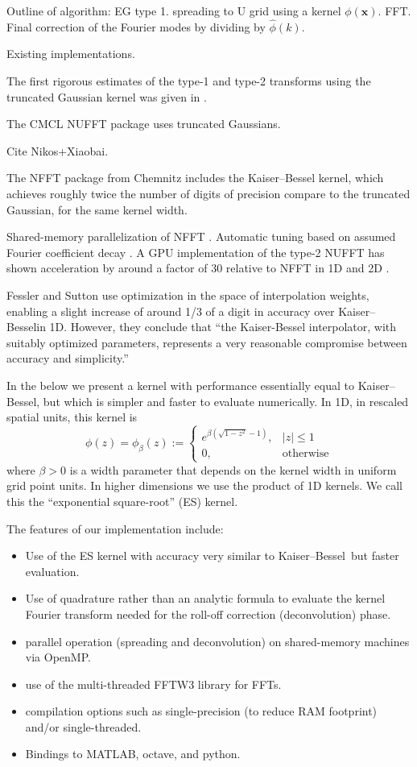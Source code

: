 \documentclass[10pt]{article}
\newcommand{\bi}{\begin{itemize}}
\newcommand{\ei}{\end{itemize}}
\newcommand{\be}{\begin{equation}}
\newcommand{\ee}{\end{equation}}
\newcommand{\mbf}[1]{{\mathbf #1}}
\newcommand{\xx}{\mbf{x}}
\newcommand{\KB}{Kaiser--Bessel}
\newcommand{\wid}{\beta}               %
\begin{document}
Outline of algorithm:
EG type 1.
spreading to U grid using a kernel $\phi(\xx)$.
FFT.
Final correction of the Fourier modes by dividing by
$\hat\phi(k)$.


Existing implementations.

The first rigorous estimates of the type-1 and type-2 transforms
using the truncated Gaussian kernel was given in \cite{dutt}.

The CMCL NUFFT package \cite{cmcl,nufft,nufft3} uses truncated Gaussians.


Cite Nikos+Xiaobai.

The NFFT package \cite{nfft} from Chemnitz
includes the Kaiser--Bessel kernel,
which
achieves roughly twice the number of digits of precision
compare to the truncated Gaussian, for the same kernel width.

Shared-memory parallelization of NFFT \cite{volkmer}.
Automatic tuning based on assumed Fourier coefficient decay \cite{nestler}.
A GPU implementation of the type-2 NUFFT has shown acceleration by around
a factor of 30 relative to NFFT in 1D and 2D \cite{cunfft}.

Fessler and Sutton \cite{fessler} use optimization in the space of
interpolation weights, enabling a slight increase of around 1/3 of a
digit in accuracy over \KB in 1D. However, they conclude that
``the
Kaiser-Bessel interpolator, with suitably optimized parameters,
represents a very reasonable compromise between accuracy and
simplicity.''

In the below we present a kernel with performance essentially
equal to \KB, but which is simpler and faster to evaluate numerically.
In 1D, in rescaled spatial units, this kernel is
\be
\phi(z) = \phi_\beta(z) :=
\left\{\begin{array}{ll}
e^{\beta (\sqrt{1-z^2}-1)}, & |z|\le 1\\
0, & \mbox{otherwise}
\end{array}
\right.
\label{ES}
\ee
where $\wid>0$ is a width parameter that depends on the kernel width
in uniform grid point units.
In higher dimensions we use the product of 1D kernels.
We call this the ``exponential square-root'' (ES) kernel.




The features of our implementation include:
\bi
\item Use of the ES kernel with accuracy very similar to \KB\ but faster evaluation.
\item Use of quadrature rather than an analytic formula to evaluate the kernel Fourier transform needed for the
  roll-off correction (deconvolution) phase.
\item parallel operation (spreading and deconvolution) on shared-memory machines via OpenMP.
  \item use of the multi-threaded FFTW3 library for FFTs.
  \item compilation options such as single-precision (to reduce RAM footprint)
    and/or single-threaded.
  \item Bindings to MATLAB, octave, and python.
\ei
\end{document}
